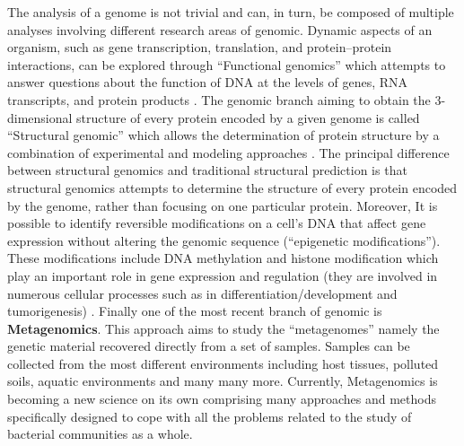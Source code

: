 The analysis of a genome is not trivial and can, in turn, be composed of multiple analyses involving different research areas of genomic. Dynamic aspects of an organism, such as gene transcription, translation, and protein–protein interactions, can be explored through ``Functional genomics'' which attempts to answer questions about the function of DNA at the levels of genes, RNA transcripts, and protein products \cite{king2004functional}. The genomic branch aiming to obtain the 3-dimensional structure of every protein encoded by a given genome is called ``Structural genomic'' which allows the determination of protein structure by a combination of experimental and modeling approaches \cite{brenner2000expectations}. The principal difference between structural genomics and traditional structural prediction is that structural genomics attempts to determine the structure of every protein encoded by the genome, rather than focusing on one particular protein. Moreover, It is possible to identify reversible modifications on a cell’s DNA that affect gene expression without altering the genomic sequence (``epigenetic modifications''). These modifications include DNA methylation and histone modification which play an important role in gene expression and regulation (they are involved in numerous cellular processes such as in differentiation/development and tumorigenesis) \cite{jones2002fundamental}. Finally one of the most recent branch of genomic is \textbf{Metagenomics}. This approach aims to study the ``metagenomes'' namely the  genetic material recovered directly from a set of samples. Samples can be collected from the most different environments including host tissues, polluted soils, aquatic environments and many many more. Currently, Metagenomics is becoming a new science on its own comprising many approaches and methods specifically designed to cope with all the problems related to the study of bacterial communities as a whole.\\


